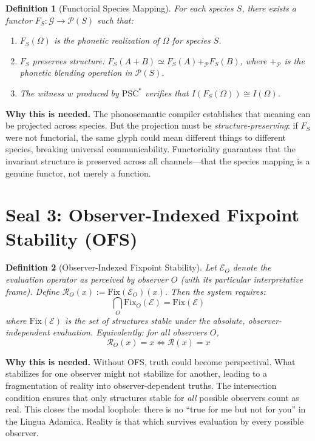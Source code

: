 \documentclass[12pt, letterpaper]{book}
\def\oplus{+}%
\newtheorem{definition}{Definition}[chapter]
\begin{document}
\begin{definition}[Functorial Species Mapping]\label{def:fsm}
For each species $S$, there exists a functor $F_S: \mathcal{G} \to \mathcal{P}(S)$ such that:
\begin{enumerate}[label=(\roman*)]
    \item $F_S(\Omega)$ is the phonetic realization of $\Omega$ for species $S$.
    \item $F_S$ preserves structure: $F_S(A \oplus B) \simeq F_S(A) \oplus_{\mathcal{P}} F_S(B)$, where $\oplus_{\mathcal{P}}$ is the phonetic blending operation in $\mathcal{P}(S)$.
    \item The witness $w$ produced by $\mathrm{PSC}^*$ verifies that $I(F_S(\Omega)) \cong I(\Omega)$.
\end{enumerate}
\end{definition}

\textbf{Why this is needed.} The phonosemantic compiler establishes that meaning can be projected across species. But the projection must be \textit{structure-preserving}: if $F_S$ were not functorial, the same glyph could mean different things to different species, breaking universal communicability. Functoriality guarantees that the invariant structure is preserved across all channels---that the species mapping is a genuine functor, not merely a function.

\section{Seal 3: Observer-Indexed Fixpoint Stability (OFS)}

\begin{definition}[Observer-Indexed Fixpoint Stability]\label{def:ofs}
Let $\mathcal{E}_O$ denote the evaluation operator as perceived by observer $O$ (with its particular interpretative frame). Define $\mathcal{R}_O(x) := \mathrm{Fix}(\mathcal{E}_O)(x)$. Then the system requires:
\[
\bigcap_{O} \mathrm{Fix}_O(\mathcal{E}) = \mathrm{Fix}(\mathcal{E})
\]
where $\mathrm{Fix}(\mathcal{E})$ is the set of structures stable under the absolute, observer-independent evaluation. Equivalently: for all observers $O$,
\[
\mathcal{R}_O(x) = x \iff \mathcal{R}(x) = x
\]
\end{definition}

\textbf{Why this is needed.} Without OFS, truth could become perspectival. What stabilizes for one observer might not stabilize for another, leading to a fragmentation of reality into observer-dependent truths. The intersection condition ensures that only structures stable for \textit{all} possible observers count as real. This closes the modal loophole: there is no ``true for me but not for you'' in the Lingua Adamica. Reality is that which survives evaluation by every possible observer.
\end{document}
